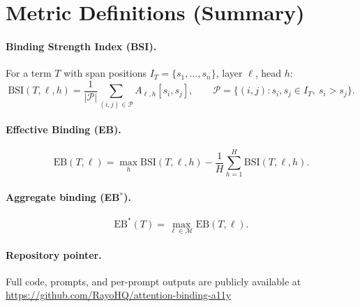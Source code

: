 \documentclass[10pt]{article} %
\begin{document}
\FloatBarrier
\section{Metric Definitions (Summary)}

\paragraph{Binding Strength Index (BSI).} For a term $T$ with span positions $I_T=\{s_1,\dots,s_n\}$, layer $\ell$, head $h$:
\[
\mathrm{BSI}(T,\ell,h)
= \frac{1}{|\mathcal{P}|}\sum_{(i,j)\in \mathcal{P}} A_{\ell,h}[s_i,s_j],
\qquad \mathcal{P} = \{(i,j): s_i,s_j\in I_T,\ s_i>s_j\}.
\]

\paragraph{Effective Binding (EB).}
\[
\mathrm{EB}(T,\ell)
= \max_h \mathrm{BSI}(T,\ell,h) - \frac{1}{H}\sum_{h=1}^{H}\mathrm{BSI}(T,\ell,h).
\]

\paragraph{Aggregate binding (EB$^*$).}
\[
\mathrm{EB}^*(T)=\max_{\ell\in\mathcal{M}} \mathrm{EB}(T,\ell).
\]

\paragraph{Repository pointer.} Full code, prompts, and per-prompt outputs are publicly available at \url{https://github.com/RayoHQ/attention-binding-a11y}



\end{document}
